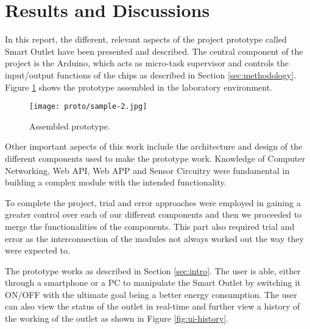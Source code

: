 %
%
%
%






\section{Results and Discussions}
\label{sec:res-and-disc}

In this report, the different, relevant aspects of the project prototype called
Smart Outlet have been presented and described. The central component of the
project is the Arduino, which acts as micro-task supervisor and controls the
input/output functions of the chips as described in Section
\ref{sec:methodology}. Figure \ref{fig:proto} shows the prototype
assembled in the laboratory environment.

\begin{figure}[ht!]
    \centering
    \texttt{[image: proto/sample-2.jpg]}
    \caption{Assembled prototype.}
    \label{fig:proto}
\end{figure}

Other important aspects of this work include the architecture and design of
the different components used to make the prototype work. Knowledge of
Computer Networking, Web API, Web APP and Sensor Circuitry were fundamental in
building a complex module with the intended functionality.

To complete the project, trial and error approaches were employed in
gaining a greater control over each of our different components and then we
proceeded to merge the functionalities of the components. This part
also required trial and error as the interconnection of the modules not always
worked out the way they were expected to.

The prototype works as described in Section \ref{sec:intro}. The user is able, 
either through a smartphone or a PC to manipulate the Smart Outlet by
switching it ON/OFF with the ultimate goal being a better energy consumption.
The user can also view the status of the outlet in real-time and further view a
history of the working of the outlet as shown in Figure \ref{fig:ui-history}.
